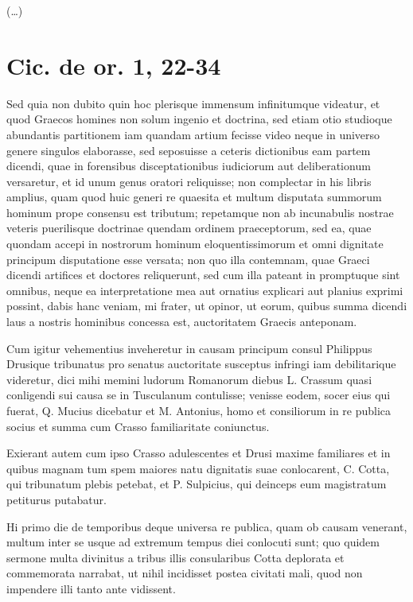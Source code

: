 (\dots)

\section*{Cic. de or. 1, 22-34}

Sed quia non dubito quin hoc plerisque immensum infinitumque videatur, et quod Graecos homines non solum ingenio et doctrina, sed etiam otio studioque abundantis partitionem iam quandam artium fecisse video neque in universo genere singulos elaborasse, sed seposuisse a ceteris dictionibus eam partem dicendi, quae in forensibus disceptationibus iudiciorum aut deliberationum versaretur, et id unum genus oratori reliquisse; non complectar in his libris amplius, quam quod huic generi re quaesita et multum disputata summorum hominum prope consensu est tributum; repetamque non ab incunabulis nostrae veteris puerilisque doctrinae quendam ordinem praeceptorum, sed ea, quae quondam accepi in nostrorum hominum eloquentissimorum et omni dignitate principum disputatione esse versata; non quo illa contemnam, quae Graeci dicendi artifices et doctores reliquerunt, sed cum illa pateant in promptuque sint omnibus, neque ea interpretatione mea aut ornatius explicari aut planius exprimi possint, dabis hanc veniam, mi frater, ut opinor, ut eorum, quibus summa dicendi laus a nostris hominibus concessa est, auctoritatem Graecis anteponam.

Cum igitur vehementius inveheretur in causam principum consul Philippus Drusique tribunatus pro senatus auctoritate susceptus infringi iam debilitarique videretur, dici mihi memini ludorum Romanorum diebus L. Crassum quasi conligendi sui causa se in Tusculanum contulisse; venisse eodem, socer eius qui fuerat, Q. Mucius dicebatur et M. Antonius, homo et consiliorum in re publica socius et summa cum Crasso familiaritate coniunctus.

Exierant autem cum ipso Crasso adulescentes et Drusi maxime familiares et in quibus magnam tum spem maiores natu dignitatis suae conlocarent, C. Cotta, qui tribunatum plebis petebat, et P. Sulpicius, qui deinceps eum magistratum petiturus putabatur.

Hi primo die de temporibus deque universa re publica, quam ob causam venerant, multum inter se usque ad extremum tempus diei conlocuti sunt; quo quidem sermone multa divinitus a tribus illis consularibus Cotta deplorata et commemorata narrabat, ut nihil incidisset postea civitati mali, quod non impendere illi tanto ante vidissent.

